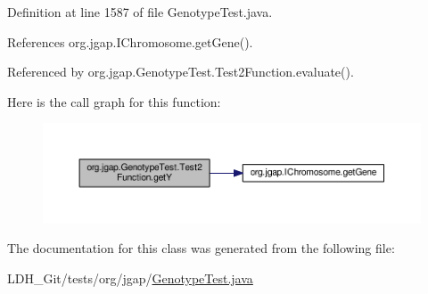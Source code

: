 Definition at line 1587 of file Genotype\-Test.\-java.



References org.\-jgap.\-I\-Chromosome.\-get\-Gene().



Referenced by org.\-jgap.\-Genotype\-Test.\-Test2\-Function.\-evaluate().



Here is the call graph for this function\-:
\nopagebreak
\begin{figure}[H]
\begin{center}
\leavevmode
\includegraphics[width=350pt]{classorg_1_1jgap_1_1_genotype_test_1_1_test2_function_a51238e7ee5a30f82f5e2e3fe962e08a6_cgraph}
\end{center}
\end{figure}




The documentation for this class was generated from the following file\-:\begin{DoxyCompactItemize}
\item 
L\-D\-H\-\_\-\-Git/tests/org/jgap/\hyperlink{_genotype_test_8java}{Genotype\-Test.\-java}\end{DoxyCompactItemize}
